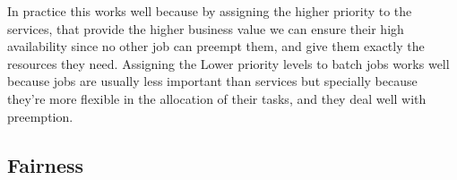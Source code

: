 \documentclass{report}                     %
\begin{document}
In practice this works well because by assigning the higher priority
to the services, that provide the higher business value  we can
ensure their high availability since no other job can preempt them,
and give them exactly the resources they need. Assigning the Lower
priority levels to batch jobs works well because jobs are usually less
important than services but specially because they're more flexible in
the allocation of their tasks, and they deal well with preemption.






\subsection{Fairness}
\end{document}
